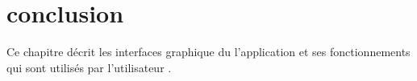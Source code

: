 






\section*{conclusion }
Ce chapitre décrit les interfaces graphique du l'application et ses fonctionnements qui sont utilisés par l'utilisateur . 